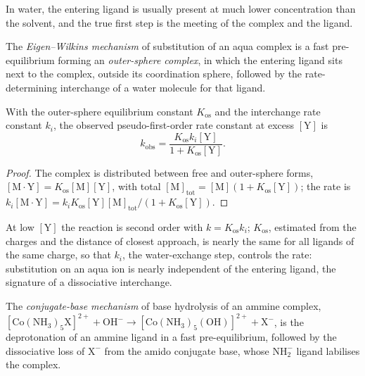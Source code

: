 In water, the entering ligand is usually present at much lower concentration
than the solvent, and the true first step is the meeting of the complex and the
ligand.

\begin{definition}\label{def:b3:complex-mechanisms:eigen-wilkins}
The \emph{Eigen--Wilkins mechanism} of
substitution of an aqua complex is a fast pre-equilibrium forming an
\emph{outer-sphere complex}, in which the entering
ligand sits next to the complex, outside its coordination sphere, followed by
the rate-determining interchange of a water molecule for that ligand.
\end{definition}

\begin{theorem}\label{thm:b3:complex-mechanisms:eigen-wilkins}
With the outer-sphere equilibrium constant $K_{\mathrm{os}}$ and the interchange rate constant
$k_i$, the observed pseudo-first-order rate constant at excess $[\mathrm Y]$ is
\[
  k_{\mathrm{obs}} = \frac{K_{\mathrm{os}}k_i[\mathrm Y]}{1 + K_{\mathrm{os}}[\mathrm Y]} .
\]
\end{theorem}

\begin{proof}
The complex is distributed between free and outer-sphere forms, $[\mathrm{M\cdot Y}] = K_{\mathrm{os}}[\mathrm M][\mathrm Y]$,
with total $[\mathrm M]_{\mathrm{tot}} = [\mathrm M](1 + K_{\mathrm{os}}[\mathrm Y])$; the rate is $k_i[\mathrm{M\cdot Y}] = k_iK_{\mathrm{os}}[\mathrm Y][\mathrm M]_{\mathrm{tot}}/(1 + K_{\mathrm{os}}[\mathrm Y])$.
\end{proof}

At low $[\mathrm Y]$ the reaction is second order with $k = K_{\mathrm{os}}k_i$; $K_{\mathrm{os}}$, estimated from the
charges and the distance of closest approach, is nearly the same for all
ligands of the same charge, so that $k_i$, the water-exchange step, controls the
rate: substitution on an aqua ion is nearly independent of the entering
ligand, the signature of a dissociative interchange.

\begin{definition}\label{def:b3:complex-mechanisms:conjugate-base}
The \emph{conjugate-base mechanism} of base
hydrolysis of an ammine complex, $\mathrm{[Co(NH_3)_5X]^{2+} + OH^- \to [Co(NH_3)_5(OH)]^{2+} + X^-}$, is
the deprotonation of an ammine ligand in a fast pre-equilibrium, followed by the
dissociative loss of $\mathrm X^-$ from the amido conjugate base, whose $\mathrm{NH_2^-}$ ligand
labilises the complex.
\end{definition}

